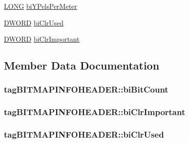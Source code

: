 \begin{DoxyCompactItemize}
\item 
\hyperlink{_free_image_8h_a27ec6163192f1e1e72d87421379ea3d4}{L\-O\-N\-G} \hyperlink{structtag_b_i_t_m_a_p_i_n_f_o_h_e_a_d_e_r_ac6226594275d045ff0d03849945d920f}{bi\-Y\-Pels\-Per\-Meter}
\item 
\hyperlink{_free_image_8h_af483253b2143078cede883fc3c111ad2}{D\-W\-O\-R\-D} \hyperlink{structtag_b_i_t_m_a_p_i_n_f_o_h_e_a_d_e_r_adbf6bd52839895672030a734d2ae752f}{bi\-Clr\-Used}
\item 
\hyperlink{_free_image_8h_af483253b2143078cede883fc3c111ad2}{D\-W\-O\-R\-D} \hyperlink{structtag_b_i_t_m_a_p_i_n_f_o_h_e_a_d_e_r_a637282b108fc8ac3bdf41479f9931ccb}{bi\-Clr\-Important}
\end{DoxyCompactItemize}


\subsection{Member Data Documentation}
\hypertarget{structtag_b_i_t_m_a_p_i_n_f_o_h_e_a_d_e_r_a713c58f9cf7d5f115938d189d59fadf5}{
\subsubsection[{bi\-Bit\-Count}]{ tag\-B\-I\-T\-M\-A\-P\-I\-N\-F\-O\-H\-E\-A\-D\-E\-R\-::bi\-Bit\-Count}}\label{structtag_b_i_t_m_a_p_i_n_f_o_h_e_a_d_e_r_a713c58f9cf7d5f115938d189d59fadf5}
\hypertarget{structtag_b_i_t_m_a_p_i_n_f_o_h_e_a_d_e_r_a637282b108fc8ac3bdf41479f9931ccb}{
\subsubsection[{bi\-Clr\-Important}]{ tag\-B\-I\-T\-M\-A\-P\-I\-N\-F\-O\-H\-E\-A\-D\-E\-R\-::bi\-Clr\-Important}}\label{structtag_b_i_t_m_a_p_i_n_f_o_h_e_a_d_e_r_a637282b108fc8ac3bdf41479f9931ccb}
\hypertarget{structtag_b_i_t_m_a_p_i_n_f_o_h_e_a_d_e_r_adbf6bd52839895672030a734d2ae752f}{
\subsubsection[{bi\-Clr\-Used}]{ tag\-B\-I\-T\-M\-A\-P\-I\-N\-F\-O\-H\-E\-A\-D\-E\-R\-::bi\-Clr\-Used}}\label{structtag_b_i_t_m_a_p_i_n_f_o_h_e_a_d_e_r_adbf6bd52839895672030a734d2ae752f}
